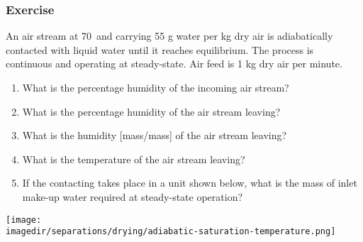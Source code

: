\begin{frame}\frametitle{Exercise}
	An air stream at 70\degC$\,$ and carrying 55 g water per kg dry air is adiabatically contacted with liquid water until it reaches equilibrium. The process is continuous and operating at steady-state. Air feed is 1 kg dry air per minute.
	{\small
	\begin{enumerate}
		\item	What is the percentage humidity of the incoming air stream? \visible<2->{{\color{myOrange}{[20\%]}}}
		\item	What is the percentage humidity of the air stream leaving?  \visible<3->{{\color{myOrange}{[100\%]}}}
		\item	What is the humidity [mass/mass] of the air stream leaving? \visible<4->{{\scriptsize{\color{myOrange}{[66g/kg]}}}}
		\item	What is the temperature of the air stream leaving? \visible<5->{{\color{myOrange}{[45\degC]}}}
		\item	If the contacting takes place in a unit shown below, what is the mass of inlet make-up water required at steady-state operation? \visible<5->{{\color{myOrange}{[$(66-55) = 11$ g per min]}}}
	\end{enumerate}}

	\iftoggle{instructor}{\vspace{-12pt}}{}
	\hfill\texttt{[image: \\imagedir/separations/drying/adiabatic-saturation-temperature.png]}
\end{frame}

